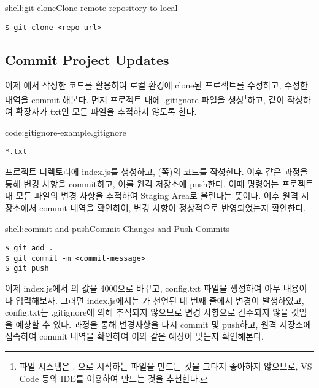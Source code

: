 \begin{shellenv}{shell:git-clone}{Clone remote repository to local}\begin{verbatim}
$ git clone <repo-url>
\end{verbatim}
\end{shellenv}
\newpage

\subsection*{Commit Project Updates}

이제 에서 작성한 코드를 활용하여 로컬 환경에 clone된 프로젝트를 수정하고, 수정한 내역을 commit 해본다. 먼저 프로젝트 내에 .gitignore 파일을 생성\footnote{파일 시스템은 . 으로 시작하는 파일을 만드는 것을 그다지 좋아하지 않으므로, VS Code 등의 IDE를 이용하여 만드는 것을 추천한다.}하고, \과 같이 작성하여 확장자가 txt인 모든 파일을 추적하지 않도록 한다.

\begin{codeenv}{code:gitignore-example}{.gitignore}\begin{verbatim}
*.txt
\end{verbatim}
\end{codeenv}

프로젝트 디렉토리에 index.js를 생성하고, (\pageref{code:nodejs-simple-web-server}쪽)의 코드를 작성한다. 이후 \와 같은 과정을 통해 변경 사항을 commit하고, 이를 원격 저장소에 push한다. 이때  명령어는 프로젝트 내 모든 파일의 변경 사항을 추적하여 Staging Area로 올린다는 뜻이다. 이후 원격 저장소에서 commit 내역을 확인하여, 변경 사항이 정상적으로 반영되었는지 확인한다.

\begin{shellenv}{shell:commit-and-push}{Commit Changes and Push Commits}\begin{verbatim}
$ git add .
$ git commit -m <commit-message>
$ git push
\end{verbatim}
\end{shellenv}

이제 index.js에서 의 값을 4000으로 바꾸고, config.txt 파일을 생성하여 아무 내용이나 입력해보자. 그러면 index.js에서는 가 선언된 네 번째 줄에서 변경이 발생하였고, config.txt는 .gitignore에 의해 추적되지 않으므로 변경 사항으로 간주되지 않을 것임을 예상할 수 있다.  과정을 통해 변경사항을 다시 commit 및 push하고, 원격 저장소에 접속하여 commit 내역을 확인하여 이와 같은 예상이 맞는지 확인해본다.
